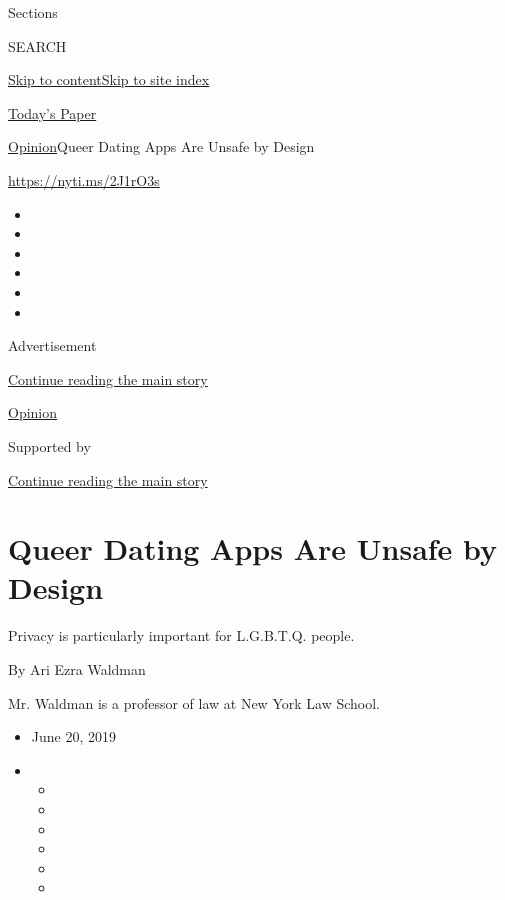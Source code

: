 Sections

SEARCH

\protect\hyperlink{site-content}{Skip to
content}\protect\hyperlink{site-index}{Skip to site index}

\href{https://myaccount.nytimes.com/auth/login?response_type=cookie\&client_id=vi}{}

\href{https://www.nytimes.com/section/todayspaper}{Today's Paper}

\href{/section/opinion}{Opinion}\textbar{}Queer Dating Apps Are Unsafe
by Design

\url{https://nyti.ms/2J1rO3s}

\begin{itemize}
\item
\item
\item
\item
\item
\item
\end{itemize}

Advertisement

\protect\hyperlink{after-top}{Continue reading the main story}

\href{/section/opinion}{Opinion}

Supported by

\protect\hyperlink{after-sponsor}{Continue reading the main story}

\hypertarget{queer-dating-apps-are-unsafe-by-design}{%
\section{Queer Dating Apps Are Unsafe by
Design}\label{queer-dating-apps-are-unsafe-by-design}}

Privacy is particularly important for L.G.B.T.Q. people.

By Ari Ezra Waldman

Mr. Waldman is a professor of law at New York Law School.

\begin{itemize}
\item
  June 20, 2019
\item
  \begin{itemize}
  \item
  \item
  \item
  \item
  \item
  \item
  \end{itemize}
\end{itemize}

